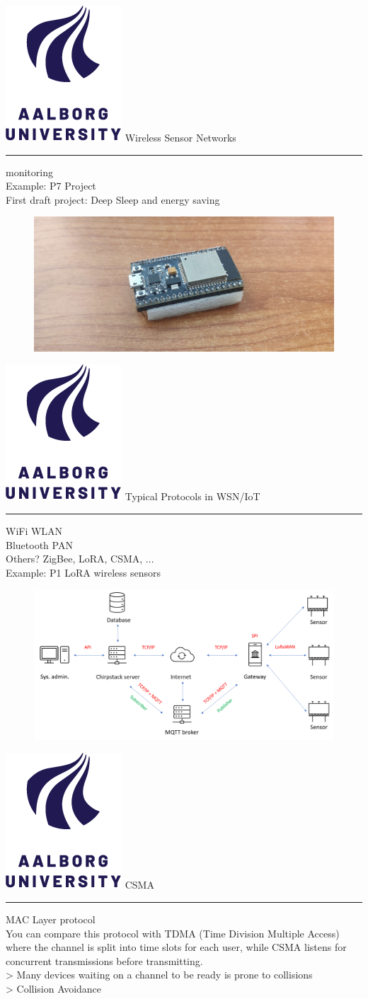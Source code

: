 \documentclass[aspectratio=1610,17pt,utf8]{beamer}
\newcommand{\regularframe}[1]{\color{black}\includegraphics[width=.05\textwidth]{figures/aau.png} #1\\\hrule}
\begin{document}
\begin{frame}{\regularframe{Wireless Sensor Networks}}
    monitoring\\

    Example: P7 Project\\
    First draft project: Deep Sleep and energy saving\\
    \begin{figure}
        \includegraphics[width=.8\textwidth]{figures/esp32.jpg}
    \end{figure}
\end{frame}

\begin{frame}{\regularframe{Typical Protocols in WSN/IoT}}
    WiFi WLAN\\
    Bluetooth PAN\\
    Others? ZigBee, LoRA, CSMA, ...\\
    Example: P1 LoRA wireless sensors\\
    \begin{figure}
        \includegraphics[width=.6\textwidth]{figures/system_oversigt.png}
    \end{figure}
\end{frame}

\begin{frame}{\regularframe{CSMA}}
    MAC Layer protocol\\
    You can compare this protocol with TDMA (Time Division Multiple Access) where the channel is split into time slots for each user, while CSMA listens for concurrent transmissions before transmitting.\\
    > Many devices waiting on a channel to be ready is prone to collisions\\
    > Collision Avoidance %
\end{frame}
\end{document}

